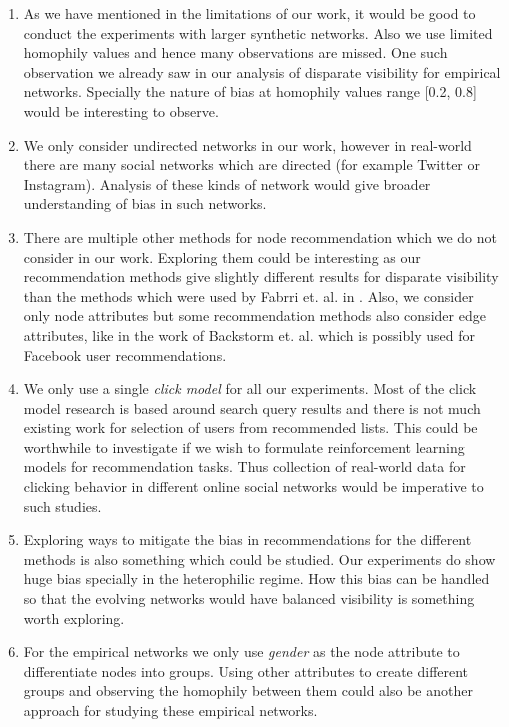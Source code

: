 \begin{enumerate}
	\item As we have mentioned in the limitations of our work, it would be good to conduct the experiments with larger synthetic networks. Also we use limited homophily values and hence many observations are missed. One such observation we already saw in our analysis of disparate visibility for empirical networks. Specially the nature of bias at homophily values range [0.2, 0.8] would be interesting to observe.
	
	\item We only consider undirected networks in our work, however in real-world there are many social networks which are directed (for example Twitter or Instagram). Analysis of these kinds of network would give broader understanding of bias in such networks.
	
	\item There are multiple other methods for node recommendation which we do not consider in our work. Exploring them could be interesting as our recommendation methods give slightly different results for disparate visibility than the methods which were used by Fabrri et. al. in \cite{fabbri2020effect}. Also, we consider only node attributes but some recommendation methods also consider edge attributes, like in the work of Backstorm et. al. \cite{backstrom2011supervised} which is possibly used for Facebook user recommendations. 
	
	\item We only use a single \textit{click model} for all our experiments. Most of the click model research is based around search query results and there is not much existing work for selection of users from recommended lists. This could be worthwhile to investigate if we wish to formulate reinforcement learning models for recommendation tasks. Thus collection of real-world data for clicking behavior in different online social networks would be imperative to such studies.
	
	\item Exploring ways to mitigate the bias in recommendations for the different methods is also something which could be studied. Our experiments do show huge bias specially in the heterophilic regime. How this bias can be handled so that the evolving networks would have balanced visibility is something worth exploring.
	
	\item For the empirical networks we only use \textit{gender} as the node attribute to differentiate nodes into groups. Using other attributes to create different groups and observing the homophily between them could also be another approach for studying these empirical networks.
\end{enumerate}